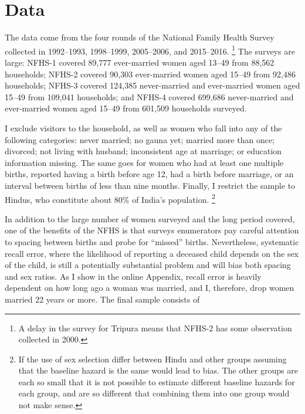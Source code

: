 \documentclass[12pt,letterpaper]{article}
\begin{document}
\section{Data\label{sec:data}}

The data come from the four rounds of the National Family Health Survey
collected in 1992--1993, 1998--1999, 2005--2006, and 2015--2016.%
\footnote{
A delay in the survey for Tripura means that NFHS-2 has some observation 
collected in 2000.
}
The surveys are large: NFHS-1 covered 89,777 ever-married women 
aged 13--49 from 88,562 households;
NFHS-2 covered 90,303 ever-married women aged 15--49 from 92,486 households;
NFHS-3 covered 124,385 never-married and ever-married women aged 
15--49 from 109,041 households;
and 
NFHS-4 covered 699,686 never-married and ever-married women aged
15--49 from 601,509 households surveyed.

I exclude visitors to the household, as well as women who fall into any of the following 
categories: never married; no gauna yet; married more than once; divorced; 
not living with husband; inconsistent age at marriage; or education information missing.  
The same goes for women who had at least one multiple births, reported having a birth 
before age 12, had a birth before marriage, or an interval between births of less than 
nine months. 
Finally, I restrict the sample to Hindus, who constitute about 80\% of India’s population.%
\footnote{
If the use of sex selection differ between Hindu and other groups assuming
that the baseline hazard is the same would lead to bias. The other
groups are each so small that it is not possible to estimate different
baseline hazards for each group, and are so different that combining
them into one group would not make sense.
} 

In addition to the large number of women surveyed and the long period covered, one of the
benefits of the NFHS is that surveys enumerators pay careful attention to spacing between 
births and probe for ``missed'' births.
Nevertheless, systematic recall error, where the likelihood of reporting a deceased 
child depends on the sex of the child, is still a potentially substantial problem and
will bias both spacing and sex ratios.
As I show in the online Appendix, recall error is heavily dependent on how long ago a 
woman was married, and I, therefore, drop women married 22 years or more.
The final sample consists of 

\end{document}
